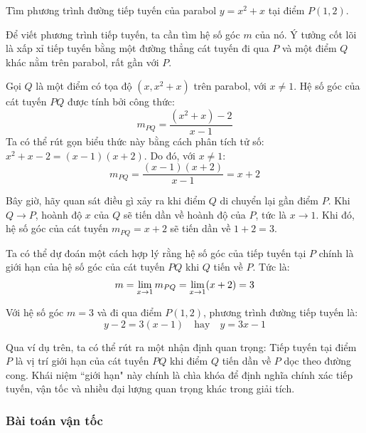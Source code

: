 \begin{example}
    Tìm phương trình đường tiếp tuyến của parabol $y = x^2 + x$ tại điểm $P(1,2)$.
\end{example}
\begin{solution}
    Để viết phương trình tiếp tuyến, ta cần tìm hệ số góc $m$ của nó. Ý tưởng cốt lõi là xấp xỉ tiếp tuyến bằng một đường thẳng cát tuyến đi qua $P$ và một điểm $Q$ khác nằm trên parabol, rất gần với $P$.

    Gọi $Q$ là một điểm có tọa độ $(x, x^2+x)$ trên parabol, với $x \neq 1$. Hệ số góc của cát tuyến $PQ$ được tính bởi công thức:
    \[m_{PQ} = \dfrac{(x^2+x) - 2}{x-1}\]
    Ta có thể rút gọn biểu thức này bằng cách phân tích tử số: $x^2+x-2 = (x-1)(x+2)$. Do đó, với $x \neq 1$:
    \[m_{PQ} = \dfrac{(x-1)(x+2)}{x-1} = x+2\]
    
    Bây giờ, hãy quan sát điều gì xảy ra khi điểm $Q$ di chuyển lại gần điểm $P$. Khi $Q \to P$, hoành độ $x$ của $Q$ sẽ tiến dần về hoành độ của $P$, tức là $x \to 1$. Khi đó, hệ số góc của cát tuyến $m_{PQ} = x+2$ sẽ tiến dần về $1+2=3$.
    
    

    Ta có thể dự đoán một cách hợp lý rằng hệ số góc của tiếp tuyến tại $P$ chính là giới hạn của hệ số góc của cát tuyến $PQ$ khi $Q$ tiến về $P$. Tức là:
    \begin{equation*}
        m = \lim\limits_{x \to 1} m_{PQ} = \lim\limits_{x \to 1} (x+2) = 3
    \end{equation*}
    
    Với hệ số góc $m=3$ và đi qua điểm $P(1,2)$, phương trình đường tiếp tuyến là:
    \begin{equation*}
        y - 2 = 3(x-1) \quad \text{hay} \quad y = 3x - 1
    \end{equation*}
\end{solution}

Qua ví dụ trên, ta có thể rút ra một nhận định quan trọng: Tiếp tuyến tại điểm $P$ là vị trí giới hạn của cát tuyến $PQ$ khi điểm $Q$ tiến dần về $P$ dọc theo đường cong. Khái niệm ``giới hạn" này chính là chìa khóa để định nghĩa chính xác tiếp tuyến, vận tốc và nhiều đại lượng quan trọng khác trong giải tích.


\subsubsection{Bài toán vận tốc}

